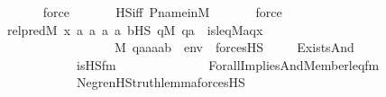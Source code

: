 \begin{isabellebody}
\ \ \ \ \ \isamarkupfalse%
\ force\ \isanewline
\ \ \ \ \isamarkupfalse%
\ HS{\isacharunderscore}{\kern0pt}iff\ P{\isacharunderscore}{\kern0pt}name{\isacharunderscore}{\kern0pt}in{\isacharunderscore}{\kern0pt}M\isanewline
\ \ \ \ \ \isamarkupfalse%
\ force\ \isanewline
\ \ \ \ \isamarkupfalse%
\isanewline
\isanewline
\ \ \isamarkupfalse%
\ {\isacharquery}{\kern0pt}rel{\isacharunderscore}{\kern0pt}pred{\isacharequal}{\kern0pt}{\isachardoublequoteopen}{\isasymlambda}M\ x\ a{}\ a{}\ a{}\ a{}{\isachardot}{\kern0pt}\ {\isasymexists}b{\isasymin}HS{\isachardot}{\kern0pt}\ {\isasymforall}q{\isasymin}M{\isachardot}{\kern0pt}\ q{\isasymin}a{}\ {\isasymand}\ is{\isacharunderscore}{\kern0pt}leq{\isacharparenleft}{\kern0pt}{\isacharhash}{\kern0pt}{\isacharhash}{\kern0pt}M{\isacharcomma}{\kern0pt}a{}{\isacharcomma}{\kern0pt}q{\isacharcomma}{\kern0pt}x{\isacharparenright}{\kern0pt}\ {\isasymlongrightarrow}\ \isanewline
\ \ \ \ \ \ \ \ \ \ \ \ \ \ \ \ \ \ {\isasymnot}{\isacharparenleft}{\kern0pt}M{\isacharcomma}{\kern0pt}\ {\isacharbrackleft}{\kern0pt}q{\isacharcomma}{\kern0pt}a{}{\isacharcomma}{\kern0pt}a{}{\isacharcomma}{\kern0pt}a{}{\isacharcomma}{\kern0pt}a{}{\isacharcomma}{\kern0pt}b{\isacharbrackright}{\kern0pt}\ {\isacharat}{\kern0pt}\ env\ {\isasymTurnstile}\ forcesHS{\isacharparenleft}{\kern0pt}{\isasymphi}{\isacharparenright}{\kern0pt}{\isacharparenright}{\kern0pt}{\isachardoublequoteclose}\ \isanewline
\ \ \isamarkupfalse%
\ {\isacharquery}{\kern0pt}{\isasympsi}{\isacharequal}{\kern0pt}{\isachardoublequoteopen}Exists{\isacharparenleft}{\kern0pt}And{\isacharparenleft}{\kern0pt}\isanewline
\ \ \ \ \ \ \ \ \ \ \ \ is{\isacharunderscore}{\kern0pt}HS{\isacharunderscore}{\kern0pt}fm{\isacharparenleft}{\kern0pt}{}{\isacharcomma}{\kern0pt}\ {}{\isacharparenright}{\kern0pt}{\isacharcomma}{\kern0pt}\ \isanewline
\ \ \ \ \ \ \ \ \ \ \ \ Forall{\isacharparenleft}{\kern0pt}Implies{\isacharparenleft}{\kern0pt}And{\isacharparenleft}{\kern0pt}Member{\isacharparenleft}{\kern0pt}{}{\isacharcomma}{\kern0pt}{}{\isacharparenright}{\kern0pt}{\isacharcomma}{\kern0pt}leq{\isacharunderscore}{\kern0pt}fm{\isacharparenleft}{\kern0pt}{}{\isacharcomma}{\kern0pt}{}{\isacharcomma}{\kern0pt}{}{\isacharparenright}{\kern0pt}{\isacharparenright}{\kern0pt}{\isacharcomma}{\kern0pt}\isanewline
\ \ \ \ \ \ \ \ \ \ \ \ Neg{\isacharparenleft}{\kern0pt}ren{\isacharunderscore}{\kern0pt}HS{\isacharunderscore}{\kern0pt}truth{\isacharunderscore}{\kern0pt}lemma{\isacharparenleft}{\kern0pt}forcesHS{\isacharparenleft}{\kern0pt}{\isasymphi}{\isacharparenright}{\kern0pt}{\isacharparenright}{\kern0pt}{\isacharparenright}{\kern0pt}{\isacharparenright}{\kern0pt}{\isacharparenright}{\kern0pt}{\isacharparenright}{\kern0pt}{\isacharparenright}{\kern0pt}{\isachardoublequoteclose}\isanewline

\end{isabellebody}

